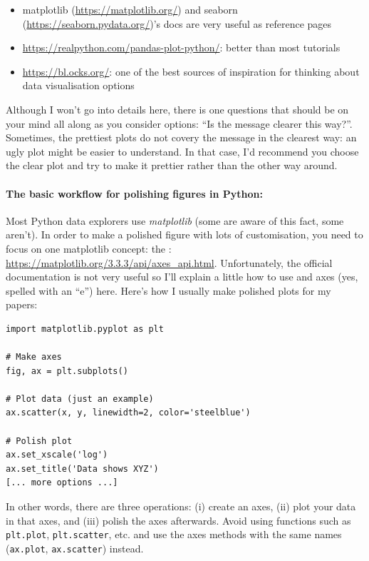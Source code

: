 \documentclass[12pt,a4paper,notitlepage,onecolumn]{article}
\begin{document}
\begin{itemize}
\item matplotlib (\url{https://matplotlib.org/}) and seaborn (\url{https://seaborn.pydata.org/})'s docs are very useful as reference pages
\item \url{https://realpython.com/pandas-plot-python/}: better than most tutorials
\item \url{https://bl.ocks.org/}: one of the best sources of inspiration for thinking about data visualisation options
\end{itemize}

Although I won't go into details here, there is one questions that should be on your mind all along as you consider options: ``Is the message clearer this way?''. Sometimes, the prettiest plots do not covery the message in the clearest way: an ugly plot might be easier to understand. In that case, I'd recommend you choose the clear plot and try to make it prettier rather than the other way around.

\paragraph{The basic workflow for polishing figures in Python:} Most Python data explorers use \textit{matplotlib} (some are aware of this fact, some aren't). In order to make a polished figure with lots of customisation, you need to focus on one matplotlib concept: the : \url{https://matplotlib.org/3.3.3/api/axes\_api.html}. Unfortunately, the official documentation is not very useful so I'll explain a little how to use and axes (yes, spelled with an ``e'') here. Here's how I usually make polished plots for my papers:

\begin{verbatim}
import matplotlib.pyplot as plt

# Make axes
fig, ax = plt.subplots()

# Plot data (just an example)
ax.scatter(x, y, linewidth=2, color='steelblue')

# Polish plot
ax.set_xscale('log')
ax.set_title('Data shows XYZ')
[... more options ...]
\end{verbatim}

In other words, there are three operations: (i) create an axes, (ii) plot your data in that axes, and (iii) polish the axes afterwards. Avoid using functions such as \texttt{plt.plot}, \texttt{plt.scatter}, etc. and use the axes methods with the same names (\texttt{ax.plot}, \texttt{ax.scatter}) instead.
\end{document}
